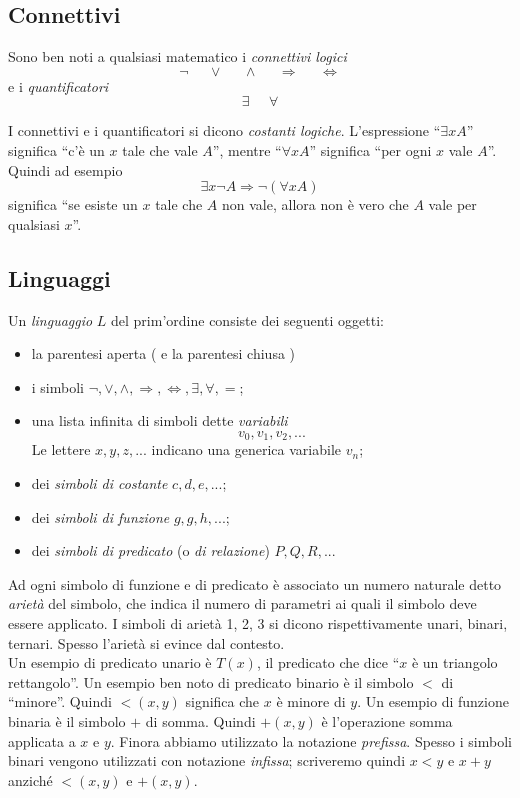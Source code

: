 \documentclass[12pt,a4paper]{report}
\theoremstyle{definition}
\theoremstyle{num.custom-title}
\DeclareMathOperator{\imp}{\Rightarrow}
\begin{document}
\subsection{Connettivi}

Sono ben noti a qualsiasi matematico i \emph{connettivi logici}
\[
\neg \;\;\;\;\; \vee \;\;\;\;\; \wedge \;\;\;\;\; \imp \;\;\;\;\; \Leftrightarrow
\]
e i \emph{quantificatori}
\[
\exists \;\;\;\;\; \forall
\]

I connettivi e i quantificatori si dicono \emph{costanti logiche}. L'espressione ``$\exists x A$'' significa ``c'è un $x$ tale che vale $A$'', mentre ``$\forall x A$'' significa ``per ogni $x$ vale $A$''. Quindi ad esempio
\[
\exists x \neg A \imp \neg (\forall x A)
\]
significa ``se esiste un $x$ tale che $A$ non vale, allora non è vero che $A$ vale per qualsiasi $x$''.


\subsection{Linguaggi}

Un \emph{linguaggio} $L$ del prim'ordine consiste dei seguenti oggetti:
\begin{itemize}
\item la parentesi aperta ( e la parentesi chiusa )
\item i simboli $\neg, \vee, \wedge, \imp, \Leftrightarrow, \exists, \forall, =$;
\item una lista infinita di simboli dette \emph{variabili}
\[
v_0, v_1, v_2,...
\]
Le lettere $x,y,z,...$ indicano una generica variabile $v_n$;
\item dei \emph{simboli di costante} $c,d,e,...$;
\item dei \emph{simboli di funzione} $g,g,h,...$;
\item dei \emph{simboli di predicato} (o \emph{di relazione}) $P,Q,R,...$
\end{itemize}
Ad ogni simbolo di funzione e di predicato è associato un numero naturale detto \emph{arietà} del simbolo, che indica il numero di parametri ai quali il simbolo deve essere applicato. I simboli di arietà 1, 2, 3 si dicono rispettivamente unari, binari, ternari. Spesso l'arietà si evince dal contesto.\\

Un esempio di predicato unario è $T(x)$, il predicato che dice ``$x$ è un triangolo rettangolo''. Un esempio ben noto di predicato binario è il simbolo $<$ di ``minore''. Quindi $<\!\!(x,y)$ significa che $x$ è minore di $y$. Un esempio di funzione binaria è il simbolo $+$ di somma. Quindi $+(x,y)$ è l'operazione somma applicata a $x$ e $y$. Finora abbiamo utilizzato la notazione \emph{prefissa}. Spesso i simboli binari vengono utilizzati con notazione \emph{infissa}; scriveremo quindi $x<y$ e $x+y$ anziché $<\!\!(x,y)$ e $+(x,y)$.
\end{document}
